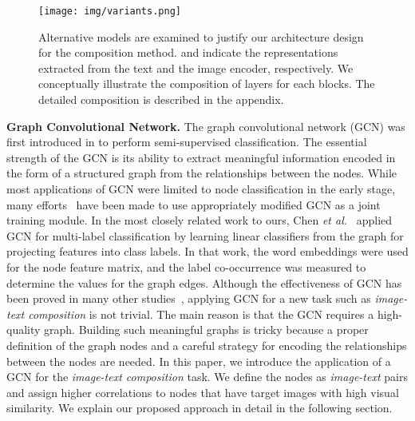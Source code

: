 \documentclass[10pt,twocolumn,letterpaper]{article}
\begin{document}
\begin{figure*}[t!]
    \begin{center}
	    \texttt{[image: img/variants.png]}
	\end{center}
	\caption{Alternative models are examined to justify our architecture design for the composition method.  and  indicate the representations extracted from the text and the image encoder, respectively. We conceptually illustrate the composition of layers for each blocks. The detailed composition is described in the appendix.}
	\label{fig:variants}
\end{figure*}

\noindent
\textbf{Graph Convolutional Network.}
The graph convolutional network (GCN) was first introduced in \cite{kipf2016semi} to perform semi-supervised classification. The essential strength of the GCN is its ability to extract meaningful information encoded in the form of a structured graph from the relationships between the nodes. While most applications of GCN were limited to node classification in the early stage, many efforts~\cite{chen2019multi,liu2020od,chen2020hierarchical,liu2019guided} have been made to use appropriately modified GCN as a joint training module. In the most closely related work to ours, Chen \textit{et al.}~\cite{chen2019multi} applied GCN for multi-label classification by learning linear classifiers from the graph for projecting features into class labels. In that work, the word embeddings were used for the node feature matrix, and the label co-occurrence was measured to determine the values for the graph edges. Although the effectiveness of GCN has been proved in many other studies~\cite{you2020l2,wei2020view,cheng2020skeleton}, applying GCN for a new task such as \textit{image-text composition} is not trivial. The main reason is that the GCN requires a high-quality graph. Building such meaningful graphs is tricky because a proper definition of the graph nodes and a careful strategy for encoding the relationships between the nodes are needed. In this paper, we introduce the application of a GCN for the \textit{image-text composition} task. We define the nodes as \textit{image-text} pairs and assign higher correlations to nodes that have target images with high visual similarity. We explain our proposed approach in detail in the following section.
\end{document}
